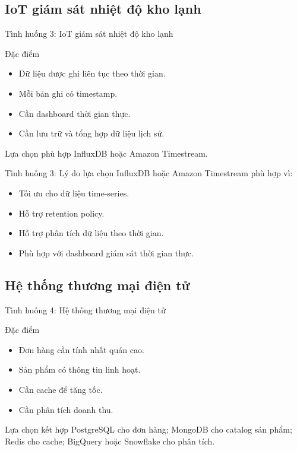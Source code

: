 \documentclass[aspectratio=169,11pt]{beamer}
\newcommand{\smallitem}{\setlength{\itemsep}{2pt}\setlength{\parskip}{0pt}}
\begin{document}
\subsection{IoT giám sát nhiệt độ kho lạnh}
\begin{frame}{Tình huống 3: IoT giám sát nhiệt độ kho lạnh}
\begin{block}{Đặc điểm}
\begin{itemize}
  \smallitem
  \item Dữ liệu được ghi liên tục theo thời gian.
  \item Mỗi bản ghi có timestamp.
  \item Cần dashboard thời gian thực.
  \item Cần lưu trữ và tổng hợp dữ liệu lịch sử.
\end{itemize}
\end{block}

\begin{exampleblock}{Lựa chọn phù hợp}
InfluxDB hoặc Amazon Timestream.
\end{exampleblock}
\end{frame}

\begin{frame}{Tình huống 3: Lý do lựa chọn}
InfluxDB hoặc Amazon Timestream phù hợp vì:
\begin{itemize}
  \smallitem
  \item Tối ưu cho dữ liệu time-series.
  \item Hỗ trợ retention policy.
  \item Hỗ trợ phân tích dữ liệu theo thời gian.
  \item Phù hợp với dashboard giám sát thời gian thực.
\end{itemize}
\end{frame}

\subsection{Hệ thống thương mại điện tử}
\begin{frame}{Tình huống 4: Hệ thống thương mại điện tử}
\begin{block}{Đặc điểm}
\begin{itemize}
  \smallitem
  \item Đơn hàng cần tính nhất quán cao.
  \item Sản phẩm có thông tin linh hoạt.
  \item Cần cache để tăng tốc.
  \item Cần phân tích doanh thu.
\end{itemize}
\end{block}

\begin{exampleblock}{Lựa chọn kết hợp}
PostgreSQL cho đơn hàng; MongoDB cho catalog sản phẩm; Redis cho cache; BigQuery hoặc Snowflake cho phân tích.
\end{exampleblock}
\end{frame}
\end{document}
